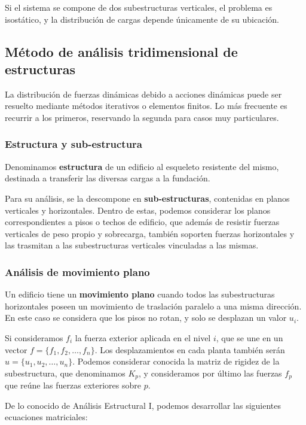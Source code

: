 \documentclass[../main.tex]{subfiles}
\begin{document}
Si el sistema se compone de dos subestructuras verticales, el problema es 
isostático, y la distribución de cargas depende únicamente de su ubicación.

\subsection{Método de análisis tridimensional de estructuras}

La distribución de fuerzas dinámicas debido a acciones dinámicas puede ser
resuelto mediante métodos iterativos o elementos finitos. Lo más frecuente
es recurrir a los primeros, reservando la segunda para casos muy particulares. 

\subsubsection{Estructura y sub-estructura}

Denominamos \textbf{estructura} de un edificio al esqueleto resistente del
mismo, destinada a transferir las diversas cargas a la fundación.

Para su análisis, se la descompone en \textbf{sub-estructuras}, contenidas
en planos verticales y horizontales. Dentro de estas, podemos considerar
los planos correspondientes a pisos o techos de edificio, que además de
resistir fuerzas verticales de peso propio y sobrecarga, también soporten 
fuerzas horizontales y las trasmitan a las subestructuras verticales vinculadas
a las mismas.

\subsubsection{Análisis de movimiento plano}

Un edificio tiene un \textbf{movimiento plano} cuando todos las subestructuras
horizontales poseen un movimiento de traslación paralelo a una misma dirección.
En este caso se considera que los pisos no rotan, y solo se desplazan un
valor $u_i$. 

Si consideramos $f_i$ la fuerza exterior aplicada en el nivel $i$, que se 
une en un vector  $f = \{f_1, f_2,\ldots, f_n\}$. Los desplazamientos en cada
planta también serán $u=\{u_1,u_2,\ldots,u_n\}$. Podemos considerar conocida
la matriz de rigidez de la subestructura, que denominamos $K_p$, y consideramos
por último las fuerzas $f_p$ que reúne las fuerzas exteriores sobre $p$. 

De lo conocido de Análisis Estructural I, podemos desarrollar las siguientes
ecuaciones matriciales:
\end{document}
